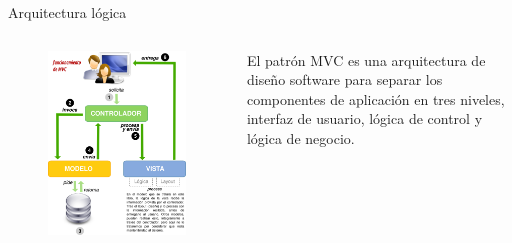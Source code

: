 \documentclass[spanish,xcolor=table,svgnames]{beamer}
\begin{document}
\begin{frame}{Arquitectura lógica}

\begin{columns}[c]
  \begin{figure}[]
\includegraphics[scale=0.3]{mvc}
\end{figure}
  \begin{block}{}
 El patrón MVC es una arquitectura de diseño software para separar los componentes de aplicación en tres niveles, interfaz de usuario, 
lógica de control y lógica de negocio.
  \end{block}
\end{columns}
\end{frame}
\end{document}
